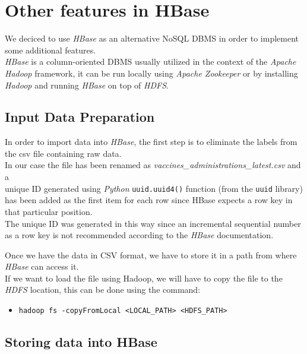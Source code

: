 \documentclass[12pt, a4paper]{article}
\begin{document}
\section{Other features in HBase} 

We deciced to use \emph{HBase} as an alternative NoSQL DBMS in order to implement some 
additional features. \\
\emph{HBase} is a column-oriented DBMS usually utilized in the context of the 
\emph{Apache Hadoop} framework, it can be run locally using \emph{Apache Zookeeper} or 
by installing \emph{Hadoop} and running \emph{HBase} on top of \emph{HDFS}.

\subsection{Input Data Preparation}

In order to import data into \emph{HBase}, the first step is to eliminate the labels 
from the csv file containing raw data. \\
In our case the file has been renamed as \emph{vaccines\_administrations\_latest.csv} 
and a \\ unique ID generated using \emph{Python} \texttt{uuid.uuid4()} function 
(from the \texttt{uuid} library) has been added as the first item for each row since
HBase expects a row key in that particular position. \\ 
The unique ID was generated in this way since an incremental sequential number as a 
row key is not recommended according to the \emph{HBase} documentation. 

\noindent
Once we have the data in CSV format, we have to store it in a path from where 
\emph{HBase} can access it. \\
If we want to load the file using Hadoop, we will have to copy the file to the 
\emph{HDFS} location, this can be done using the command:
\begin{footnotesize}
  \begin{itemize}
    \item[] \texttt{hadoop fs -copyFromLocal <LOCAL\_PATH>  <HDFS\_PATH>} 
  \end{itemize}
\end{footnotesize}

\subsection{Storing data into HBase}
\end{document}
